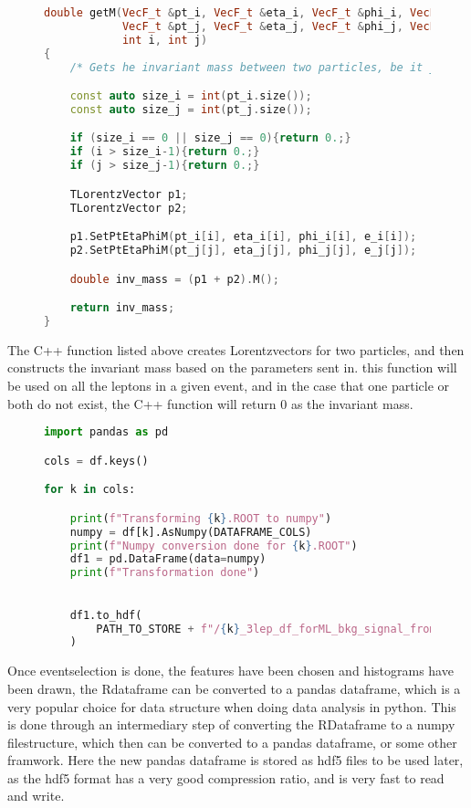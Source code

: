 \begin{figure}[H]
    \centering
\begin{lstlisting}[language=C++, style=cppstyle, label={code:cpp_func_example}]
double getM(VecF_t &pt_i, VecF_t &eta_i, VecF_t &phi_i, VecF_t &e_i,
            VecF_t &pt_j, VecF_t &eta_j, VecF_t &phi_j, VecF_t &e_j,
            int i, int j)
{
    /* Gets he invariant mass between two particles, be it jets or leptons */

    const auto size_i = int(pt_i.size());
    const auto size_j = int(pt_j.size());

    if (size_i == 0 || size_j == 0){return 0.;}
    if (i > size_i-1){return 0.;}
    if (j > size_j-1){return 0.;}

    TLorentzVector p1;
    TLorentzVector p2;

    p1.SetPtEtaPhiM(pt_i[i], eta_i[i], phi_i[i], e_i[i]);
    p2.SetPtEtaPhiM(pt_j[j], eta_j[j], phi_j[j], e_j[j]);

    double inv_mass = (p1 + p2).M();

    return inv_mass;
}
\end{lstlisting}
\end{figure}
The C++ function listed above creates Lorentzvectors for two particles, and then constructs the invariant mass based on the parameters sent in. 
this function will be used on all the leptons in a given event, and in the case that one particle or both do not exist, the C++ function will
return 0 as the invariant mass. \par

\begin{figure}[H]
    \centering
\begin{lstlisting}[language=Python, style=pythonstyle, label={code:python_func_example_2}]
import pandas as pd 

cols = df.keys()

for k in cols:

    print(f"Transforming {k}.ROOT to numpy")
    numpy = df[k].AsNumpy(DATAFRAME_COLS)
    print(f"Numpy conversion done for {k}.ROOT")
    df1 = pd.DataFrame(data=numpy)
    print(f"Transformation done")
    

    df1.to_hdf(
        PATH_TO_STORE + f"/{k}_3lep_df_forML_bkg_signal_fromRDF.hdf5", "mini"
    )

\end{lstlisting}
\end{figure}

Once eventselection is done, the features have been chosen and histograms have been drawn, the Rdataframe can be converted to a pandas dataframe, which is a very popular choice
for data structure when doing data analysis in python. This is done through an intermediary step of converting the RDataframe to a numpy filestructure, which then can be converted
to a pandas\cite{reback2020pandas} dataframe, or some other framwork. Here the new pandas dataframe is stored as hdf5\cite{hdf5} files to be used later, as the hdf5 format 
has a very good compression ratio, and is very fast to read and write. 